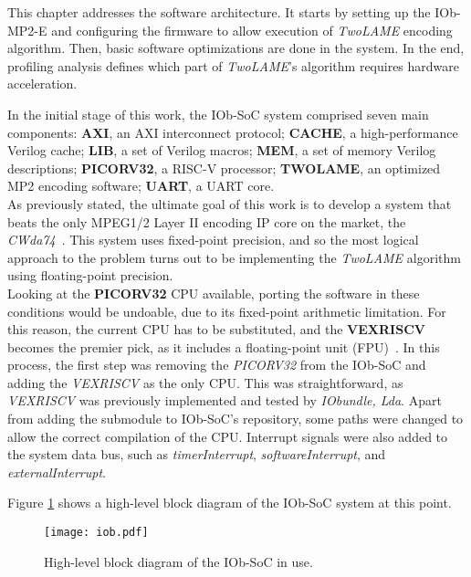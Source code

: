 This chapter addresses the software architecture.
It starts by setting up the IOb-MP2-E and configuring the firmware to allow execution of \textit{TwoLAME} encoding algorithm. Then, basic software optimizations are done in the system. In the end, profiling analysis defines which part of \textit{TwoLAME}'s algorithm requires hardware acceleration.

In the initial stage of this work, the IOb-SoC system comprised seven main components: \textbf{AXI}, an AXI interconnect protocol;
\textbf{CACHE}, a high-performance Verilog cache; \textbf{LIB}, a set of Verilog macros; \textbf{MEM}, a set of memory Verilog descriptions; \textbf{PICORV32}, a RISC-V processor; \textbf{TWOLAME}, an optimized MP2 encoding software; \textbf{UART}, a UART core. \\
As previously stated, the ultimate goal of this work is to develop a system that beats the only MPEG1/2 Layer II encoding IP core on the market, the \textit{CWda74}~\cite{CWda74}. This system uses fixed-point precision, and so the most logical approach to the problem turns out to be implementing the \textit{TwoLAME} algorithm using floating-point precision. \\
Looking at the \textbf{PICORV32} CPU available, porting the software in these conditions would be undoable, due to its fixed-point arithmetic limitation. For this reason, the current CPU has to be substituted, and the \textbf{VEXRISCV} becomes the premier pick, as it includes a floating-point unit (FPU)~\cite{fpu}. In this process, the first step was removing the \textit{PICORV32} from the IOb-SoC and adding the \textit{VEXRISCV} as the only CPU. This was straightforward, as \textit{VEXRISCV} was previously implemented and tested by \textit{IObundle, Lda}. Apart from adding the submodule to IOb-SoC's repository, some paths were changed to allow the correct compilation of the CPU. Interrupt signals were also added to the system data bus, such as \textit{timerInterrupt}, \textit{softwareInterrupt}, and \textit{externalInterrupt}.

Figure \ref{fig:newiob} shows a high-level block diagram of the IOb-SoC system at this point.

\vspace{0.1cm}

\begin{figure}[H]
\centerline{\texttt{[image: iob.pdf]}}
\caption{High-level block diagram of the IOb-SoC in use.}
\label{fig:newiob}
\end{figure}

